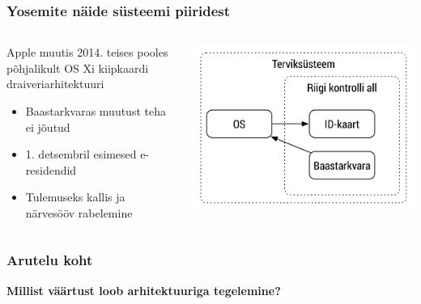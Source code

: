 \begin{frame}[label=Yosemite]
	\frametitle{Yosemite näide süsteemi piiridest}
	\begin{columns}[t]
		\begin{column}{6.5cm}
			Apple muutis 2014. teises pooles põhjalikult OS Xi kiipkaardi draiveriarhitektuuri
			\begin{itemize}
				\item Baastarkvaras muutust teha ei jõutud 
				\item 1. detsembril esimesed e-residendid
				\item Tulemuseks kallis ja närvesööv rabelemine
			\end{itemize}
		\end{column}
		\begin{column}[T]{4.5cm}
			\includegraphics[width=\textwidth]{yosemite.pdf}
		\end{column}
	\end{columns}
\end{frame}

\begin{frame}[fragile]
  \frametitle{Arutelu koht}
		\begin{center}
			\textbf{Millist väärtust loob arhitektuuriga tegelemine?}
		\end{center}
\end{frame}

